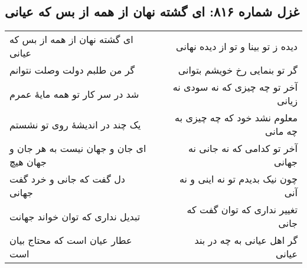 \begin{center}
\section*{غزل شماره ۸۱۶: ای گشته نهان از همه از بس که عیانی}
\label{sec:816}
\begin{longtable}{l p{0.5cm} r}
ای گشته نهان از همه از بس که عیانی
&&
دیده ز تو بینا و تو از دیده نهانی
\\
گر من طلبم دولت وصلت نتوانم
&&
گر تو بنمایی رخ خویشم بتوانی
\\
شد در سر کار تو همه مایهٔ عمرم
&&
آخر تو چه چیزی که نه سودی نه زیانی
\\
یک چند در اندیشهٔ روی تو نشستم
&&
معلوم نشد خود که چه چیزی به چه مانی
\\
ای جان و جهان نیست به هر جان و جهان هیچ
&&
آخر تو کدامی که نه جانی نه جهانی
\\
دل گفت که جانی و خرد گفت جهانی
&&
چون نیک بدیدم تو نه اینی و نه آنی
\\
تبدیل نداری که توان خواند جهانت
&&
تغییر نداری که توان گفت که جانی
\\
عطار عیان است که محتاج بیان است
&&
گر اهل عیانی به چه در بند عیانی
\\
\end{longtable}
\end{center}
